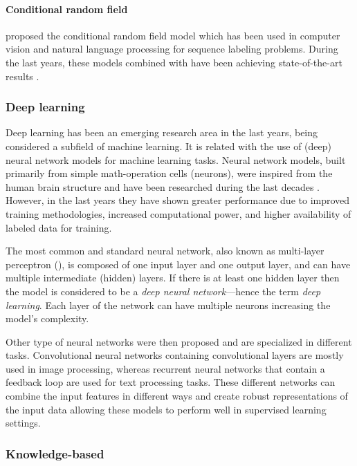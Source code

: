 \paragraph{Conditional random field}

\textcite{lafferty2001a} proposed the conditional random field model which has been used in computer vision and natural language processing for sequence labeling problems.
During the last years, these models combined with  have been achieving state-of-the-art results \parencite{lample2016a}.


\subsubsection{Deep learning}

Deep learning has been an emerging  research area in the last years, being considered a subfield of machine learning.
It is related with the use of (deep) neural network models for machine learning tasks.
Neural network models, built primarily from simple math-operation cells (neurons), were inspired from the human brain structure and have been researched during the last decades \parencite{hinton1992a}.
However, in the last years they have shown greater performance due to improved training methodologies, increased computational power, and higher availability of labeled data for training.

The most common and standard neural network, also known as multi-layer perceptron (), is composed of one input layer and one output layer, and can have multiple intermediate (hidden) layers.
If there is at least one hidden layer then the model is considered to be a \textit{deep neural network}---hence the term \textit{deep learning}.
Each layer of the network can have multiple neurons increasing the model's complexity.

Other type of neural networks were then proposed and are specialized in different tasks.
Convolutional neural networks containing convolutional layers are mostly used in image processing, whereas recurrent neural networks that contain a feedback loop are used for text processing tasks.
These different networks can combine the input features in different ways and create robust representations of the input data allowing these models to perform well in supervised learning settings.


\subsubsection{Knowledge-based}

